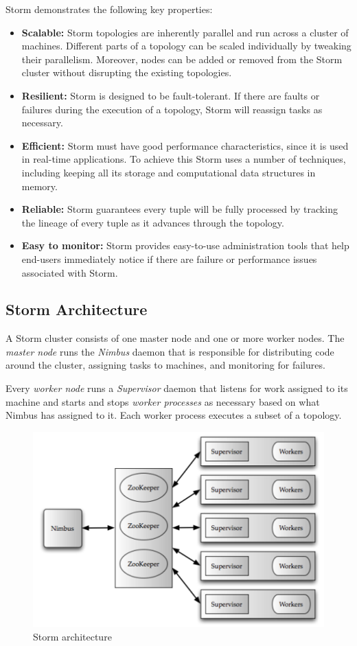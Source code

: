 Storm demonstrates the following key properties:
\begin{itemize}
\item \textbf{Scalable:} Storm topologies are inherently parallel and run across a cluster of machines. Different parts of a topology can be scaled individually by tweaking their parallelism. Moreover, nodes can be added or removed from the Storm cluster without disrupting the existing topologies.
\item \textbf{Resilient:} Storm is designed to be fault-tolerant. If there are faults or failures during the execution of a topology, Storm will reassign tasks as necessary.
\item \textbf{Efficient:} Storm must have good performance characteristics, since it is used in real-time applications. To achieve this Storm uses a number of techniques, including keeping all its storage and computational data structures in memory.
\item \textbf{Reliable:} Storm guarantees every tuple will be fully processed by tracking the lineage of every tuple as it advances through the topology.
\item \textbf{Easy to monitor:} Storm provides easy-to-use administration tools that help end-users immediately notice if there are failure or performance issues associated with Storm.
\end{itemize}

\subsection{Storm Architecture}

A Storm cluster consists of one master node and one or more worker nodes. The \emph{master node} runs the \emph{Nimbus} daemon that is responsible for distributing code around the cluster, assigning tasks to machines, and monitoring for failures.

Every \emph{worker node} runs a \emph{Supervisor} daemon that listens for work assigned to its machine and starts and stops \emph{worker processes} as necessary based on what Nimbus has assigned to it. Each worker process executes a subset of a topology.

\begin{figure}[H]
\centering
\includegraphics{figures/storm_cluster}
\caption{Storm architecture}
\label{figure:storm_cluster}
\end{figure}

